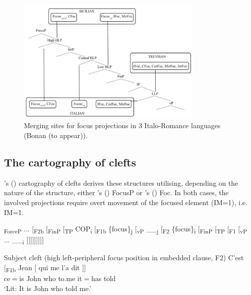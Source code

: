 \documentclass[fleqn,10pt]{wlscirep}
\begin{document}
\begin{figure}[h!]
    \centering
    \includegraphics[width=90mm]{images/focus.png}
    \caption{Merging sites for focus projections in 3 Italo-Romance languages (Bonan (to appear)).}
    \label{fig:focus}
  \end{figure}

\subsection*{The cartography of clefts}

\citeauthor{belletti2015}’s (\citeyear{belletti2015}) cartography of clefts derives these structures utilising, depending on the nature of the structure, either \citeauthor{rizzi1997fine}’s (\citeyear{rizzi1997fine}) FocusP or \citeauthor{belletti2004}’s (\citeyear{belletti2004}) Foc. 
In both cases, the involved projections require overt movement of the focused element (IM=1), i.e. IM=1.

\begin{exe}
    \ex {[}\textsubscript{ForceP} ... {[}\textsubscript{F2b} {[}\textsubscript{FinP} {[}\textsubscript{TP} COP\textsubscript{i} {[}\textsubscript{F1b} \{focus\}\textsubscript{j} {[}\textsubscript{vP} \_\_\textsubscript{j} {[}\textsubscript{F2} \{focus\}\textsubscript{i} {[}\textsubscript{FinP} {[}\textsubscript{TP} {[}\textsubscript{F1} {[}\textsubscript{vP} ... \_\_\textsubscript{i} {]]]]]]]]]}
\end{exe}

\begin{exe}
    \ex	Subject cleft (high left-peripheral focus position in embedded clause, F2)
        \gll {[} C'est {[}\textsubscript{F1b} Jean {[} qui me l'a dit {]]}\\
        {} ce$=$is  {}		John	{}	who to.me it$=$has told {}\\
        \vspace*{-3mm}
        \glt ‘Lit: It is John who told me.’
\end{exe}
\end{document}
